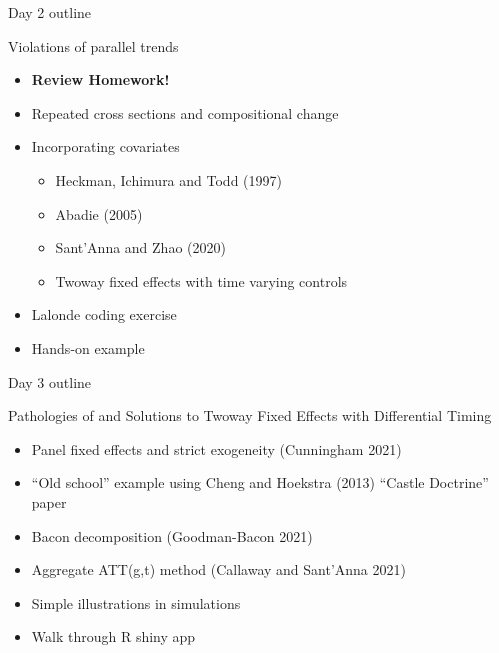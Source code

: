 \documentclass{beamer}
\begin{document}
\begin{frame}{Day 2 outline}

Violations of parallel trends
	\begin{itemize}
	\item \textbf{Review Homework!}
	\item Repeated cross sections and compositional change
	\item Incorporating covariates
		\begin{itemize}
		\item Heckman, Ichimura and Todd (1997)
		\item Abadie (2005)
		\item Sant’Anna and Zhao (2020)
		\item Twoway fixed effects with time varying controls	
		\end{itemize}
	\item Lalonde coding exercise
	\item Hands-on example
	\end{itemize}

\end{frame}

\begin{frame}{Day 3 outline}

Pathologies of and Solutions to Twoway Fixed Effects with Differential Timing
	\begin{itemize}
	\item Panel fixed effects and strict exogeneity (Cunningham 2021) 
	\item ``Old school'' example using Cheng and Hoekstra (2013) “Castle Doctrine” paper
	\item Bacon decomposition (Goodman-Bacon 2021)
	\item Aggregate ATT(g,t) method (Callaway and Sant’Anna 2021)
	\item Simple illustrations in simulations
	\item Walk through R shiny app
	\end{itemize}

\end{frame}
\end{document}
